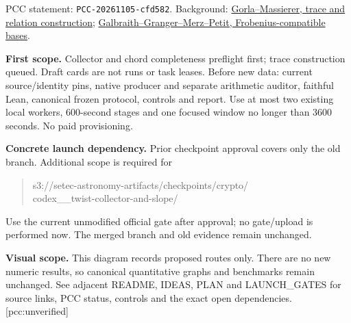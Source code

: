 \documentclass[11pt]{article}
\begin{document}
\small PCC statement: \texttt{PCC-20261105-cfd582}. Background:
\href{https://arxiv.org/pdf/1405.1059}{Gorla--Massierer, trace and relation construction};
\href{https://sacworkshop.org/SAC20/files/preproceedings/18-IndexCalculus.pdf}{Galbraith--Granger--Merz--Petit, Frobenius-compatible bases}.
\normalsize

\textbf{First scope.} Collector and chord completeness preflight first;
trace construction queued. Draft cards are not runs or task leases. Before
new data: current source/identity pins, native producer and separate arithmetic
auditor, faithful Lean, canonical frozen protocol, controls and report.
Use at most two existing local workers, 600-second stages and one focused
window no longer than 3600 seconds. No paid provisioning.

\textbf{Concrete launch dependency.} Prior checkpoint approval covers only
the old branch. Additional scope is required for
\begin{quote}\small\ttfamily
s3://setec-astronomy-artifacts/checkpoints/crypto/\\
codex\_\_twist-collector-and-slope/
\end{quote}
Use the current unmodified official gate after approval; no gate/upload is
performed now. The merged branch and old evidence remain unchanged.

\textbf{Visual scope.} This diagram records proposed routes only. There are
no new numeric results, so canonical quantitative graphs and benchmarks remain
unchanged. See adjacent README, IDEAS, PLAN and LAUNCH\_GATES for source links,
PCC status, controls and the exact open dependencies. [pcc:unverified]
\end{document}
